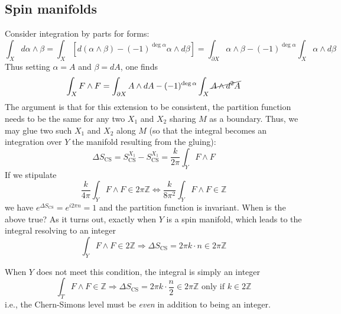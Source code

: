 \documentclass{report}
\begin{document}
\subsection{Spin manifolds}
Consider integration by parts for forms: 
\begin{equation*}
	\int_X d\alpha \wedge \beta = \int_X \left[d(\alpha\wedge\beta) 
		- (-1)^{\deg \alpha}\alpha\wedge d\beta\right]
		= \int_{\partial X}\alpha\wedge\beta 
			-(-1)^{\deg \alpha} \int_{X}\alpha \wedge d\beta
\end{equation*}
Thus setting $ \alpha = A $ and $ \beta = dA $, one finds 
\begin{equation*}
	\int_X F \wedge F 
		= \int_{\partial X} A \wedge dA
	-(-1)^{\deg\alpha}\int_{X} \cancel{A \wedge d^2 A}
\end{equation*}
The argument is that for this extension to be consistent, the partition function 
needs to be the same for any two $ X_1 $ and $ X_2 $ sharing $ M $ as a boundary. 
Thus, we may glue two such $ X_1 $ and $ X_2 $ along $ M $ (so that the integral 
becomes an integration over $ Y $ the manifold resulting from the gluing): 
\begin{equation*}
	\Delta S_{\text{CS}}
		= S_{\text{CS}}^{X_1}
		  - S_{\text{CS}}^{X_1}
		= \frac{k}{2\pi}\int_Y F\wedge F
\end{equation*}
If we stipulate 
\begin{equation*}
	\frac{k}{4\pi} \int_Y F\wedge F
		\in 2\pi\mathbb{Z}
		\iff 
	\frac{k}{8\pi^2} \int_Y F\wedge F
		\in \mathbb{Z}
\end{equation*}
we have $ e^{\Delta S_{\text{CS}}} = e^{i2\pi n}= 1$ and the partition function 
is invariant. When is the above true? As it turns out, exactly when $ Y $ is a 
spin manifold, which leads to the integral resolving to an integer
\begin{equation*}
	\int_Y F\wedge F \in 2\mathbb{Z} \Longrightarrow  \Delta S_{\text{CS}} = 
	2\pi k \cdot n \in 2\pi \mathbb{Z}
\end{equation*}

When $ Y $ does not meet this condition, the integral is simply an integer
\begin{equation*}
	\int_T F\wedge F \in \mathbb{Z} \Longrightarrow \Delta S_{\text{CS}} =
	2\pi k \cdot \frac{n}{2} \in 2\pi \mathbb{Z}
	\text{ only if }k\in 2\mathbb{Z}
\end{equation*}
i.e., the Chern-Simons level must be \textit{even} in addition to being an 
integer.
\end{document}
